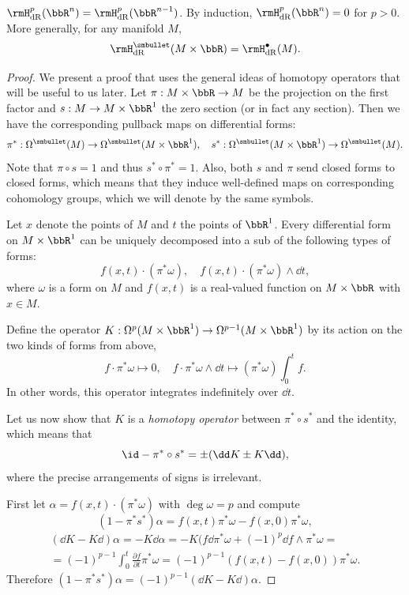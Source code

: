 \begin{thm}\label{Poincare lem}
    $\rmH^p_{\rm dR}(\bbR^{n})=\rmH^{p}_{\rm dR}(\bbR^{n-1})$. By induction, $\rmH^p_{\rm dR}(\bbR^{n})=0$ for $p>0$. More generally, for any manifold $M$,
    \[\rmH^{\smbullet }_{\rm dR}(M\times\bbR)=\rmH^{\bullet}_{\rm dR}(M).\]
\end{thm}
\begin{proof}
    We present a proof that uses the general ideas of homotopy operators that will be useful to us later. Let $\pi:M\times\bbR \to M$ be the projection on the first factor and $s:M\to M\times\bbR^1$ the zero section (or in fact any section). Then we have the corresponding pullback maps on differential forms:
    \[\pi^\ast:\Omega^{\smbullet }(M)\to \Omega^{\smbullet }(M\times\bbR^1),\quad s^\ast: \Omega^{\smbullet }(M\times\bbR^1)\to \Omega^{\smbullet }(M).\]
    Note that $\pi\circ s=1$ and thus $s^\ast\circ\pi^\ast=1$. Also, both $s$ and $\pi$ send closed forms to closed forms, which means that they induce well-defined maps on corresponding cohomology groups, which we will denote by the same symbols.
    
    Let $x$ denote the points of $M$ and $t$ the points of $\bbR^1$. Every differential form on $M\times\bbR^1$ can be uniquely decomposed into a sub of the following types of forms:
    \[f(x,t)\cdot (\pi^\ast\omega),\quad f(x,t)\cdot(\pi^\ast\omega)\wedge\dd t,\]
    where $\omega$ is a form on $M$ and $f(x,t)$ is a real-valued function on $M\times\bbR$ with $x\in M$.
    
    Define the operator $K:\Omega^p(M\times\bbR^1)\to \Omega^{p-1}(M\times\bbR^1)$ by its action on the two kinds of forms from above,
    \[f\cdot \pi^\ast \omega\mapsto 0,\quad f\cdot\pi^\ast \omega \wedge\dd t\mapsto (\pi^\ast\omega)\int_0^t f.\]
    In other words, this operator integrates indefinitely over $\dd t$.
    
    Let us now show that $K$ is a \emph{homotopy operator} between $\pi^\ast\circ s^\ast$ and the identity, which means that
    \[\id-\pi^\ast\circ s^\ast=\pm (\dd K\pm K \dd),\]
    where the precise arrangements of signs is irrelevant.
    
    First let $\alpha=f(x,t)\cdot (\pi^\ast\omega)$ with $\deg \omega=p$ and compute
    \[(1-\pi^\ast s^\ast)\alpha=f(x,t)\pi^\ast\omega-f(x,0)\pi^\ast\omega,\]
    \begin{multline}
        (\dd K-K \dd)\alpha=-K\dd\alpha=-K(f\dd\pi^\ast\omega+(-1)^p\dd f\wedge\pi^\ast\omega=\\=(-1)^{p-1}\int_0^t\frac{\partial f}{\partial t}\pi^\ast\omega=(-1)^{p-1}(f(x,t)-f(x,0))\pi^\ast\omega.
    \end{multline}
    Therefore $(1-\pi^\ast s^\ast)\alpha=(-1)^{p-1}(\dd K-K \dd)\alpha$.
    

\end{proof}
